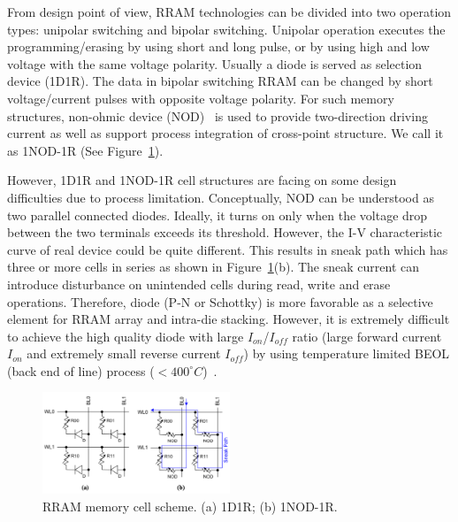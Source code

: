 From design point of view, RRAM technologies can be divided into two operation types: unipolar switching and bipolar switching. Unipolar operation executes the programming/erasing by using short and long pulse, or by using high and low voltage with the same voltage polarity. Usually a diode is served as selection device (1D1R). The data in bipolar switching RRAM can be changed by short voltage/current pulses with opposite voltage polarity. For such memory structures, non-ohmic device (NOD)~\cite{Yan4430255} is used to provide two-direction driving current as well as support process integration of cross-point structure. We call it as 1NOD-1R (See Figure~\ref{RRAM2}).

However, 1D1R and 1NOD-1R cell structures are facing on some design difficulties due to process limitation. Conceptually, NOD can be understood as two parallel connected diodes. Ideally, it turns on only when the voltage drop between the two terminals exceeds its threshold. However, the I-V characteristic curve of real device could be quite different.
This results in sneak path which has three or more cells in series as shown in Figure~\ref{RRAM2}(b). The sneak current can introduce disturbance on unintended cells during read, write and erase operations. Therefore, diode (P-N or Schottky) is more favorable as a selective element for RRAM array and intra-die stacking. However, it is extremely difficult to achieve the high quality diode with large $I_{on}$/$I_{off}$ ratio (large forward current $I_{on}$ and extremely small reverse current $I_{off}$) by using temperature limited BEOL (back end of line) process ($<400 ^{\circ}C$)~\cite{Sun:147791}.



\begin{figure}\centering
\includegraphics[width=0.50\textwidth]{./figure/HL-RRAM2.png}
\caption{RRAM memory cell scheme. (a) 1D1R; (b) 1NOD-1R.}\label{RRAM2}
\end{figure}




